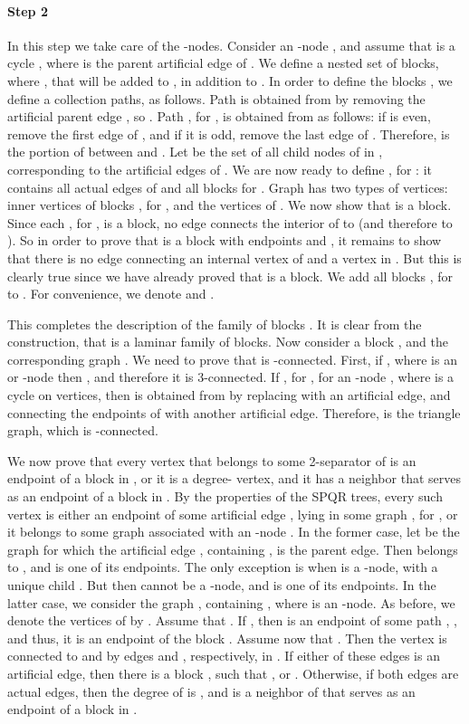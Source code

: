 \documentclass[twoside,leqno,twocolumn]{article}
\begin{document}
\paragraph{Step 2} In this step we take care of the -nodes. Consider an -node , and assume that  is a cycle
, where  is the parent artificial edge of . We define a nested set  of blocks, where , that will be added to , in addition to . In order to define the blocks , we define a collection  paths, as follows. Path  is obtained from  by removing the artificial parent edge , so . Path , for , is obtained from  as follows: if  is even, remove the first edge of , and if it is odd, remove the last edge of . Therefore,  is the portion of  between  and . Let  be the set of all child nodes of  in , corresponding to the artificial edges of .
We are now ready to define , for : it contains all actual edges of  and
all blocks  for . 
Graph  has two types of vertices: inner vertices of blocks , for , and
the vertices of . 
We now show that  is a block. Since each , for , is a block, no edge connects the interior of 
to  (and therefore to ). So in order to prove that
 is a block with endpoints  and ,
it remains to show that there is no edge connecting an internal vertex  of  and 
a vertex in . But this is clearly true since we have already proved that  is a block.
We add all blocks , for  to .
For convenience, we denote  and .

This completes the description of the family of blocks .
It is clear from the construction, that  is a laminar family of blocks.
Now consider a block , and the corresponding graph . We need to prove that  is -connected. First,
if , where  is an  or -node then , and therefore it is 3-connected. 
If , for , for an -node , where  is a cycle on  vertices, then  is obtained from  by replacing  with an artificial edge, and connecting the endpoints of  with another artificial edge. Therefore,  is the triangle graph, which is -connected.

We now prove that every vertex  that belongs to some 2-separator of  
is an endpoint of a block in , or it is a degree- vertex, and it has a neighbor that serves as an endpoint of a block in . By the properties of the SPQR trees, every such vertex 
 is either an endpoint of some artificial edge , lying in some graph , for , or it belongs to some graph 
associated with an -node . In the former case, let   be the graph for which the artificial edge , containing , is the parent edge. Then  belongs to , and  is one of its endpoints. The only exception is when  is a -node, with a unique child . But then  cannot be a -node, and  is one of its endpoints. In the latter case, we consider the graph
, containing , where  is an -node. As before, we denote the vertices of  by .
Assume that . If , then  is an endpoint of some path
, , and thus, it is an endpoint of the block . Assume now that . Then the vertex 
 is connected to  and  by edges  and , respectively, in . If either of these edges is an artificial edge, then there is a block , such that , or . Otherwise, if both edges are actual edges, then the degree of  is , and  is a neighbor of  that serves as an endpoint of a block in . 
\end{document}
